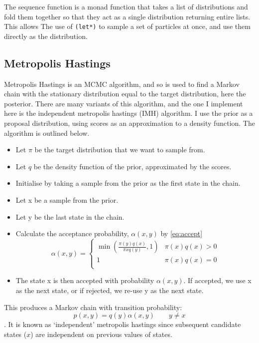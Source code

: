 The sequence function is a monad function that takes a list of distributions and fold them together so that they act as a single distribution returning entire lists. This allows The use of \texttt{(let*)} to sample a set of particles at once, and use them directly as the distribution.

\subsection{Metropolis Hastings} \label{sec:mh}
Metropolis Hastings is an MCMC algorithm, and so is used to find a Markov chain with the stationary distribution equal to the target distribution, here the posterior. There are many variants of this algorithm, and the one I implement here is the independent metropolis hastings (IMH) algorithm. I use the prior as a proposal distribution, using scores as an approximation to a density function. The algorithm is outlined below.
\begin{itemize}
	\item Let $\pi$ be the target distribution that we want to sample from.
	\item Let $q$ be the density function of the prior, approximated by the scores.
	\item Initialise by taking a sample from the prior as the first state in the chain.
	\item Let x be a sample from the prior.
	\item Let y be the last state in the chain.
	\item Calculate the acceptance probability, $\alpha(x,y)$ by \eqref{eq:accept}
	      \begin{equation}
	      	\label{eq:accept}
	      	\alpha(x,y) = 
	      	\begin{cases}	
	      		\min{\left( \frac{\pi(y)q(x)}{\pi{x}q(y)},1 \right) } & \pi(x)q(x) > 0 \\
	      		1                                                     & \pi(x)q(x) = 0 \\
	      	\end{cases}
	      \end{equation}	      	      	      	      
	\item The state x is then accepted with probability $\alpha(x,y)$. If accepted, we use x as the next state, or if rejected, we re-use y as the next state. 
\end{itemize}

This produces a Markov chain with transition probability: \[p(x, y) = q(y)\alpha(x, y) \quad\quad y\neq x\].
It is known as `independent' metropolis hastings since subsequent candidate states ($x$) are independent on previous values of states.

